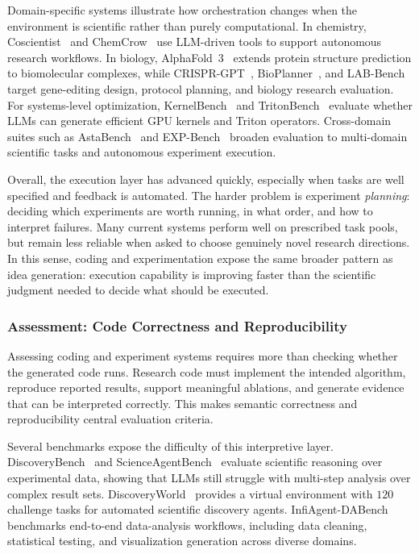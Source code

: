 Domain-specific systems illustrate how orchestration changes when the environment is scientific rather than purely computational. In chemistry, Coscientist~\cite{boiko2023coscientist} and ChemCrow~\cite{bran2024chemcrow} use LLM-driven tools to support autonomous research workflows. In biology, AlphaFold~3~\cite{abramson2024alphafold3} extends protein structure prediction to biomolecular complexes, while CRISPR-GPT~\cite{crisprgpt2024}, BioPlanner~\cite{bioplanner2024}, and LAB-Bench~\cite{labbench2024} target gene-editing design, protocol planning, and biology research evaluation. For systems-level optimization, KernelBench~\cite{kernelbench2025} and TritonBench~\cite{tritonbench2025} evaluate whether LLMs can generate efficient GPU kernels and Triton operators. Cross-domain suites such as AstaBench~\cite{astabench2025} and EXP-Bench~\cite{expbench2025} broaden evaluation to multi-domain scientific tasks and autonomous experiment execution.

Overall, the execution layer has advanced quickly, especially when tasks are well specified and feedback is automated. The harder problem is experiment \emph{planning}: deciding which experiments are worth running, in what order, and how to interpret failures. Many current systems perform well on prescribed task pools, but remain less reliable when asked to choose genuinely novel research directions. In this sense, coding and experimentation expose the same broader pattern as idea generation: execution capability is improving faster than the scientific judgment needed to decide what should be executed.



\subsubsection{Assessment: Code Correctness and Reproducibility}
\label{sec:exp_analysis}

Assessing coding and experiment systems requires more than checking whether the generated code runs. Research code must implement the intended algorithm, reproduce reported results, support meaningful ablations, and generate evidence that can be interpreted correctly. This makes semantic correctness and reproducibility central evaluation criteria.

Several benchmarks expose the difficulty of this interpretive layer. DiscoveryBench~\cite{majumder2024discoverybench} and ScienceAgentBench~\cite{scienceagentbench2024} evaluate scientific reasoning over experimental data, showing that LLMs still struggle with multi-step analysis over complex result sets. DiscoveryWorld~\cite{discoveryworld2024} provides a virtual environment with $120$ challenge tasks for automated scientific discovery agents. InfiAgent-DABench~\cite{infidabench2024} benchmarks end-to-end data-analysis workflows, including data cleaning, statistical testing, and visualization generation across diverse domains.


